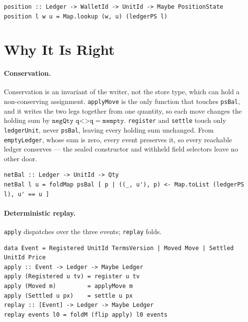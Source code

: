 \documentclass[11pt,a4paper]{article}
\begin{document}
\begin{lstlisting}
position :: Ledger -> WalletId -> UnitId -> Maybe PositionState
position l w u = Map.lookup (w, u) (ledgerPS l)
\end{lstlisting}

\section{Why It Is Right}
\label{sec:right}

\paragraph{Conservation.}
Conservation is an invariant of the writer, not the store type, which can hold a
non-conserving assignment. \texttt{applyMove} is the only function that touches
\texttt{psBal}, and it writes the two legs together from one quantity, so each move
changes the holding sum by $\texttt{negQty q} \mathbin{\texttt{<>}} \texttt{q} =
\texttt{mempty}$. \texttt{register} and \texttt{settle} touch only
\texttt{ledgerUnit}, never \texttt{psBal}, leaving every holding sum unchanged. From
\texttt{emptyLedger}, whose sum is zero, every event preserves it, so every
reachable ledger conserves --- the sealed constructor and withheld field selectors leave
no other door.

\begin{lstlisting}
netBal :: Ledger -> UnitId -> Qty
netBal l u = foldMap psBal [ p | ((_, u'), p) <- Map.toList (ledgerPS l), u' == u ]
\end{lstlisting}

\paragraph{Deterministic replay.}
\texttt{apply} dispatches over the three events; \texttt{replay} folds.

\begin{lstlisting}
data Event = Registered UnitId TermsVersion | Moved Move | Settled UnitId Price
apply :: Event -> Ledger -> Maybe Ledger
apply (Registered u tv) = register u tv
apply (Moved m)         = applyMove m
apply (Settled u px)    = settle u px
replay :: [Event] -> Ledger -> Maybe Ledger
replay events l0 = foldM (flip apply) l0 events
\end{lstlisting}
\end{document}
